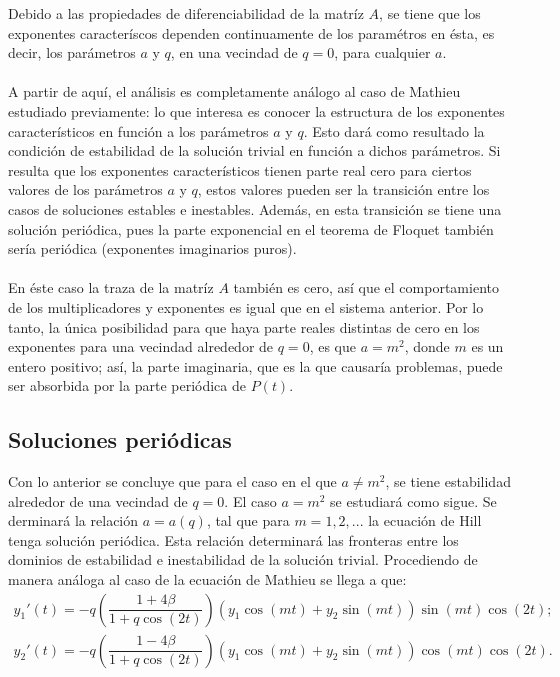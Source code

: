 Debido a las propiedades de diferenciabilidad de la matríz $A$, se tiene que los exponentes caracteríscos dependen continuamente de los paramétros en ésta, es decir, los parámetros $a$ y $q$, en una vecindad de $q=0$, para cualquier $a$.
\\
\\
A partir de aquí, el análisis es completamente análogo al caso de Mathieu estudiado previamente: lo que interesa es conocer la estructura de los exponentes característicos en función a los parámetros $a$ y $q$. Esto dará como resultado la condición de estabilidad de la solución trivial en función a dichos parámetros. Si resulta que los exponentes característicos tienen parte real cero para ciertos valores de los parámetros $a$ y $q$, estos valores pueden ser la transición entre los casos de soluciones estables e inestables. Además, en esta transición se tiene una solución periódica, pues la parte exponencial en el teorema de Floquet también sería periódica (exponentes imaginarios puros). 
\\
\\
En éste caso la traza de la matríz $A$ también es cero, así que el comportamiento de los multiplicadores y exponentes es igual que en el sistema anterior. Por lo tanto, la única posibilidad para que haya parte reales distintas de cero en los exponentes para una vecindad alrededor de $q=0$, es que $a=m^2$, donde $m$ es un entero positivo; así, la parte imaginaria, que es la que causaría problemas, puede ser absorbida por la parte periódica de $P(t)$. 
\subsection{Soluciones periódicas}
Con lo anterior se concluye que para el caso en el que $a\neq m^2$, se tiene estabilidad alrededor de una vecindad de $q=0$. El caso $a=m^2$ se estudiará como sigue. Se derminará la relación $a=a(q)$, tal que para $m=1,2,...$ la ecuación de Hill tenga solución periódica. Esta relación determinará las fronteras entre los dominios de estabilidad e inestabilidad de la solución trivial. Procediendo de manera análoga al caso de la ecuación de Mathieu se llega a que:
\begin{eqnarray}
y_{1}'(t)=-q\left( \dfrac{1+4\beta}{1+q\cos(2t)}\right)(y_{1}\cos(mt)+y_{2}\sin(mt))\sin(mt)\cos(2t);
\end{eqnarray}
\begin{eqnarray}
y_{2}'(t)=-q\left( \dfrac{1-4\beta}{1+q\cos(2t)}\right)(y_{1}\cos(mt)+y_{2}\sin(mt))\cos(mt)\cos(2t).
\end{eqnarray}
